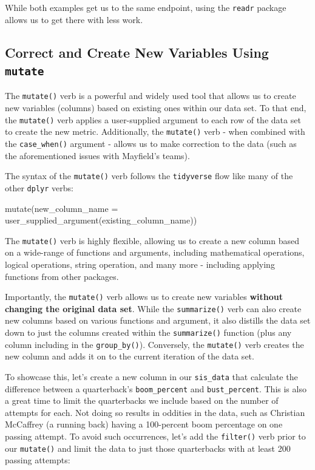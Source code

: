 \documentclass[
  letterpaper,
]{krantz}
\newenvironment{Shaded}{\begin{snugshade}}{\end{snugshade}}
\newcommand{\AttributeTok}[1]{\textcolor[rgb]{0.40,0.45,0.13}{#1}}
\newcommand{\FunctionTok}[1]{\textcolor[rgb]{0.28,0.35,0.67}{#1}}
\newcommand{\NormalTok}[1]{\textcolor[rgb]{0.00,0.23,0.31}{#1}}
\begin{document}
While both examples get us to the same endpoint, using the
\texttt{readr} package allows us to get there with less work.

\hypertarget{correct-and-create-new-variables-using-mutate}{%
\subsection{\texorpdfstring{Correct and Create New Variables Using
\texttt{mutate}}{Correct and Create New Variables Using mutate}}\label{correct-and-create-new-variables-using-mutate}}

The \texttt{mutate()} verb is a powerful and widely used tool that
allows us to create new variables (columns) based on existing ones
within our data set. To that end, the \texttt{mutate()} verb applies a
user-supplied argument to each row of the data set to create the new
metric. Additionally, the \texttt{mutate()} verb - when combined with
the \texttt{case\_when()} argument - allows us to make correction to the
data (such as the aforementioned issues with Mayfield's teams).

The syntax of the \texttt{mutate()} verb follows the \texttt{tidyverse}
flow like many of the other \texttt{dplyr} verbs:

\begin{Shaded}
\begin{Highlighting}[]
\FunctionTok{mutate}\NormalTok{(}\AttributeTok{new\_column\_name =} \FunctionTok{user\_supplied\_argument}\NormalTok{(existing\_column\_name))}
\end{Highlighting}
\end{Shaded}

The \texttt{mutate()} verb is highly flexible, allowing us to create a
new column based on a wide-range of functions and arguments, including
mathematical operations, logical operations, string operation, and many
more - including applying functions from other packages.

Importantly, the \texttt{mutate()} verb allows us to create new
variables \textbf{without changing the original data set}. While the
\texttt{summarize()} verb can also create new columns based on various
functions and argument, it also distills the data set down to just the
columns created within the \texttt{summarize()} function (plus any
column including in the \texttt{group\_by()}). Conversely, the
\texttt{mutate()} verb creates the new column and adds it on to the
current iteration of the data set.

To showcase this, let's create a new column in our \texttt{sis\_data}
that calculate the difference between a quarterback's
\texttt{boom\_percent} and \texttt{bust\_percent}. This is also a great
time to limit the quarterbacks we include based on the number of
attempts for each. Not doing so results in oddities in the data, such as
Christian McCaffrey (a running back) having a 100-percent boom
percentage on one passing attempt. To avoid such occurrences, let's add
the \texttt{filter()} verb prior to our \texttt{mutate()} and limit the
data to just those quarterbacks with at least 200 passing attempts:
\end{document}

